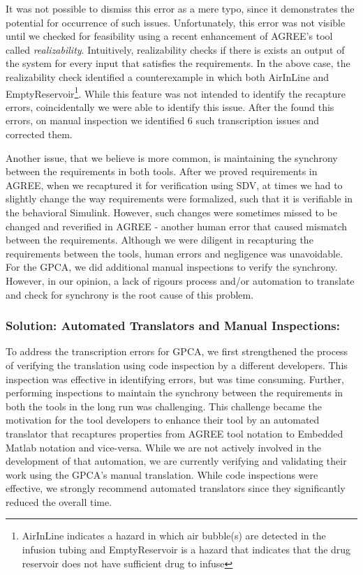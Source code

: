 It was not possible to dismiss this error as a mere typo, since it demonstrates the potential for occurrence of such issues. Unfortunately, this error was not visible until we checked for feasibility using a recent enhancement of AGREE's tool called \emph{realizability}. Intuitively, realizability checks if there is exists an output of the system for every input that satisfies the requirements. In the above case, the realizability check identified a counterexample in which both AirInLine and EmptyReservoir\footnote{AirInLine indicates a hazard in which air bubble(s) are detected in the infusion tubing and EmptyReservoir is a hazard that indicates that the drug reservoir does not have sufficient drug to infuse}. While this feature was not intended to identify the recapture errors, coincidentally we were able to identify this issue. After the found this errors, on manual inspection we identified 6 such transcription issues and corrected them.

Another issue, that we believe is more common, is maintaining the synchrony between the requirements in both tools. After we proved requirements in AGREE, when we recaptured it for verification using SDV, at times we had to slightly change the way requirements were formalized, such that it is verifiable in the behavioral Simulink. However, such changes were sometimes missed to be changed and reverified in AGREE - another human error that caused mismatch between the requirements. Although we were diligent in recapturing the requirements between the tools, human errors and negligence was unavoidable. For the GPCA, we did additional manual inspections to verify the synchrony. However, in our opinion, a lack of rigours process and/or automation to translate and check for synchrony is the root cause of this problem. %

\subsubsection {Solution: Automated Translators and Manual Inspections:}

To address the transcription errors for GPCA, we first strengthened the process of verifying the translation using code inspection by a different developers. This inspection was effective in identifying errors, but was time consuming. Further, performing inspections to maintain the synchrony between the requirements in both the tools  in the long run was challenging. This challenge became the motivation for the tool developers to enhance their tool by an automated translator that recaptures properties from AGREE tool notation to Embedded Matlab notation and vice-versa. While we are not actively involved in the development of that automation, we are currently verifying and validating their work using the GPCA's manual translation. While code inspections were effective, we strongly recommend automated translators since they significantly reduced the overall time. 
